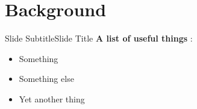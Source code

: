 \section{Background}

\begin{myframe}[t]{Slide Subtitle}{Slide Title}
  \small \textbf{A list of useful things} : \newline\linebreak \tiny \vspace{-.2cm}
    \begin{itemize} \itemsep1.2ex
      \item Something \cite{example}
      \item Something else
      \item Yet another thing
    \end{itemize}
\end{myframe}
